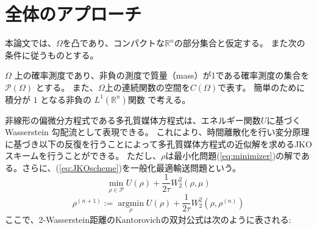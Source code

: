 \begin{comment}
研究では、以下の研究内容を検討します。

* BFM を PME に適用するための一般化
* 提案するソルバーの効率性の評価
* 提案するソルバーの他のソルバーとの比較

BFM を PME に適用するためには、以下の点に留意する必要があります。

* PME は、剛性があり非線形な方程式であるため、BFM の解法の適応が必要となる。
* PME の境界条件は、通常、PDE の解法に固有の形状となる。BFM の解法では、これらの境界条件をどのように扱うかが課題となる。

提案するソルバーの効率性を評価するためには、以下の点に留意する必要があります。

* ソルバーの収束精度と収束速度を評価する。
* ソルバーの計算コストを評価する。

提案するソルバーと他のソルバーとの比較を行うためには、以下の点に留意する必要があります。

* ソルバーの収束精度と収束速度を比較する。
* ソルバーの計算コストを比較する。

本研究では、これらの点に留意して、提案するソルバーの有効性を検証します。

\end{comment}
















\section{全体のアプローチ}
\label{sect:全体のアプローチ}
本論文では、$\Omega$を凸であり、コンパクトな$\mathbb{R}^n$の部分集合と仮定する。
また次の条件に従うものとする。
\begin{dfn}
\label{dfn:1}
    $\Omega$ 上の確率測度であり、非負の測度で質量（mass）が1である確率測度の集合を $\mathcal{P} (\Omega)$ とする。
    また、$\Omega$上の連続関数の空間を$C(\Omega)$で表す。
    簡単のために積分が \(1\) となる非負の \(L^1(\mathbb{R}^n)\)関数 で考える。
\end{dfn}

非線形の偏微分方程式である多孔質媒体方程式は、エネルギー関数$U$に基づくWasserstein 勾配流として表現できる。
これにより、時間離散化を行い変分原理に基づき以下の反復を行うことによって多孔質媒体方程式の近似解を求めるJKOスキームを行うことができる。
ただし、$\rho$は最小化問題(\ref{eq:minimizer})の解である。さらに、(\ref{eq:JKOscheme})を一般化最適輸送問題という。
\begin{equation}
    \label{eq:minimizer}
    \min_{\rho \in \mathcal{P}} U(\rho) + \frac{1}{2\tau} W_2^2(\rho, \mu)
\end{equation}
\begin{equation}
    \label{eq:JKOscheme}
    \rho^{(n+1)} := \underset{\rho}{\operatorname{argmin}} U(\rho) + \frac{1}{2\tau} W_2^2(\rho, \rho^{(n)})
\end{equation}
ここで、2-Wasserstein距離のKantorovichの双対公式は次のように表される:


